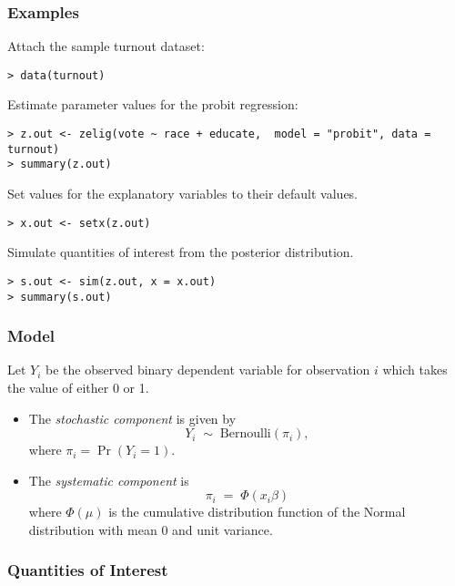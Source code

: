 \subsubsection{Examples}
Attach the sample turnout dataset:
\begin{verbatim}
> data(turnout)
\end{verbatim}
Estimate parameter values for the probit regression:
\begin{verbatim}
> z.out <- zelig(vote ~ race + educate,  model = "probit", data = turnout) 
> summary(z.out)
\end{verbatim}
Set values for the explanatory variables to their default values.
\begin{verbatim}
> x.out <- setx(z.out)
\end{verbatim}
Simulate quantities of interest from the posterior distribution.
\begin{verbatim}
> s.out <- sim(z.out, x = x.out)
> summary(s.out)
\end{verbatim}

\subsubsection{Model}
Let $Y_i$ be the observed binary dependent variable for observation
$i$ which takes the value of either 0 or 1.
\begin{itemize}
\item The \emph{stochastic component} is given by  
\begin{equation*}
Y_i \; \sim \; \textrm{Bernoulli}(\pi_i), 
\end{equation*}
where $\pi_i=\Pr(Y_i=1)$.

\item The \emph{systematic component} is 
\begin{equation*}
  \pi_i \; = \; \Phi (x_i \beta)
\end{equation*}
where $\Phi(\mu)$ is the cumulative distribution function of the
Normal distribution with mean 0 and unit variance.
\end{itemize}

\subsubsection{Quantities of Interest}

